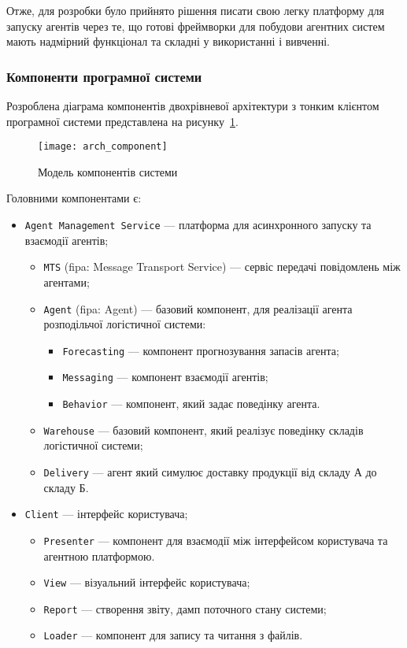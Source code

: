 Отже, для розробки було прийнято рішення писати свою легку платформу для запуску агентів через те, що готові фреймворки для побудови агентних систем мають надмірний функціонал та складні у використанні і вивченні.

\subsubsection{Компоненти програмної системи}
Розроблена діаграма компонентів двохрівневої архітектури з тонким клієнтом програмної системи представлена на рисунку~\ref{fig:arch_component}. 

\begin{figure}[H]
	\centering
	\texttt{[image: arch\_component]}
	\caption{Модель компонентів системи}
	\label{fig:arch_component}
\end{figure} 

Головними компонентами є:
\begin{itemize}
	\item \texttt{Agent Management Service} --- платформа для асинхронного запуску та взаємодії агентів;
	\begin{itemize}
		\item \texttt{MTS} (\acrshort{fipa}: Message Transport Service) --- сервіс передачі повідомлень між агентами;
		\item \texttt{Agent} (\acrshort{fipa}: Agent) --- базовий компонент, для реалізації агента розподільчої логістичної системи:
		\begin{itemize}
			\item \texttt{Forecasting} --- компонент прогнозування запасів агента;
			\item \texttt{Messaging} --- компонент взаємодії агентів;
			\item \texttt{Behavior} --- компонент, який задає поведінку агента.
		\end{itemize}
		\item \texttt{Warehouse} --- базовий компонент, який реалізує поведінку складів логістичної системи;
		\item \texttt{Delivery} --- агент який симулює доставку продукції від складу А до складу Б.
	\end{itemize}
	\item \texttt{Client} --- інтерфейс користувача;
	\begin{itemize}	
		\item \texttt{Presenter} --- компонент для взаємодії між інтерфейсом користувача та агентною платформою.
		\item \texttt{View} --- візуальний інтерфейс користувача;
		\item \texttt{Report} --- створення звіту, дамп поточного стану системи;
		\item \texttt{Loader} --- компонент для запису та читання з файлів.
	\end{itemize}
\end{itemize}

